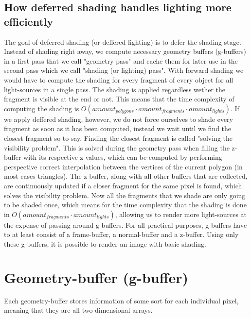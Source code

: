 \documentclass{ACGSeminar}
\begin{document}
	\subsection{How deferred shading handles lighting more efficiently}
		The goal of deferred shading (or deffered lighting) is to defer the shading stage. %
		Instead of shading right away, we compute necessary geometry buffers (g-buffers) in a first pass that we call "geometry pass" and cache 
		them for later use in the second pass which we call "shading (or lighting) pass". With forward shading we would have to compute the shading for every fragment of every object for all light-sources in a single pass. The shading is applied regardless wether the fragment is visible at the end or not. This means that the time complexity of computing the shading is $O(amount_{polygons} \cdot amount_{fragments} \cdot amount_{lights})$. If we apply deffered shading, however, we do not force ourselves to shade every fragment as soon as it has been computed, instead we wait until we find the closest fragment so to say. Finding the closest fragment is called "solving the visibility problem". This is solved during the geometry pass when filling the z-buffer with its respective z-values, which can be computed by performing perspective correct interpolation between the vertices of the current polygon (in most cases triangles). The z-buffer, along with all other buffers that are collected, are continuously updated if a closer fragment for the same pixel is found, which solves the visibility problem. Now all the fragments that we shade are only going to be shaded once, which means for the time complexity that the shading is done in $O(amount_{fragments} \cdot amount_{lights})$, allowing us to render more light-sources at the expense of passing around g-buffers. For all practical purposes, g-buffers have to at least consist of a frame-buffer, a normal-buffer and a z-buffer. Using only these g-buffers, it is possible to render an image with basic shading.

\section{Geometry-buffer (g-buffer)}
	Each geometry-buffer stores information of some sort for each individual pixel, meaning that they are all two-dimensional arrays.
\end{document}
